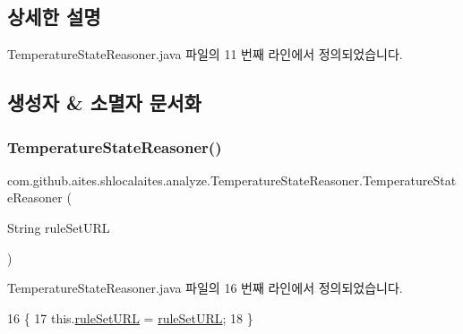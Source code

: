 \subsection{상세한 설명}


Temperature\+State\+Reasoner.\+java 파일의 11 번째 라인에서 정의되었습니다.



\subsection{생성자 \& 소멸자 문서화}
\mbox{\label{classcom_1_1github_1_1aites_1_1shlocalaites_1_1analyze_1_1_temperature_state_reasoner_aeb0acd0cdfb8efdc2eed85ad10fbeddb}} 
\subsubsection{\texorpdfstring{Temperature\+State\+Reasoner()}{TemperatureStateReasoner()}}
{\footnotesize\ttfamily com.\+github.\+aites.\+shlocalaites.\+analyze.\+Temperature\+State\+Reasoner.\+Temperature\+State\+Reasoner (\begin{DoxyParamCaption}\item[{String}]{rule\+Set\+U\+RL }\end{DoxyParamCaption})}



Temperature\+State\+Reasoner.\+java 파일의 16 번째 라인에서 정의되었습니다.


\begin{DoxyCode}
16                                                       \{
17         this.\mbox{\hyperlink{classcom_1_1github_1_1aites_1_1shlocalaites_1_1analyze_1_1_temperature_state_reasoner_af2c499ddf5d8d5cc0394b6ba37c948f7}{ruleSetURL}} = \mbox{\hyperlink{classcom_1_1github_1_1aites_1_1shlocalaites_1_1analyze_1_1_temperature_state_reasoner_af2c499ddf5d8d5cc0394b6ba37c948f7}{ruleSetURL}};
18     \}
\end{DoxyCode}


